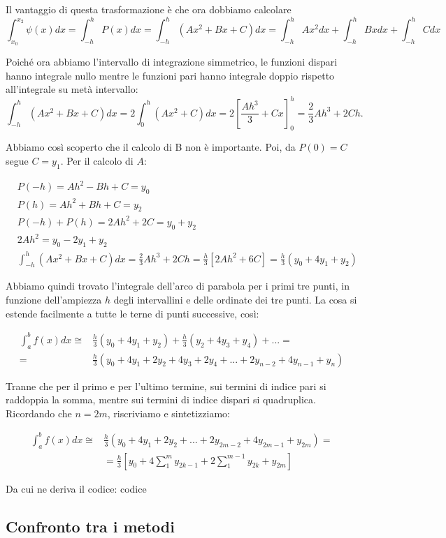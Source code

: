 \documentclass{article}
\begin{document}
Il vantaggio di questa trasformazione è che ora dobbiamo calcolare
\[
\int_{x_0}^{x_2}\psi(x)dx=\int_{-h}^{h}P(x)dx=\int_{-h}^{h}(Ax^2+Bx+C)dx=
\int_{-h}^{h}Ax^2dx+\int_{-h}^{h}Bxdx+\int_{-h}^{h}Cdx\]

Poiché ora abbiamo l’intervallo di integrazione simmetrico, le funzioni dispari hanno integrale nullo mentre le funzioni pari hanno integrale doppio rispetto all’integrale su metà intervallo:
\[
\int_{-h}^{h}(Ax^2+Bx+C)dx= 2 \int_0^{h}(Ax^2+C)dx
=2\left[\frac{Ah^3}{3}+Cx\right]_0^h=\frac{2}{3}Ah^3+2Ch.\]

Abbiamo così scoperto che il calcolo di B non è importante. Poi, da $P(0)=C$ segue $C=y_1$. Per il calcolo di $A$:

\begin{align*}
&P(-h)=Ah^2-Bh+C=y_0\\
&P(h)=Ah^2+Bh+C=y_2\\
&P(-h)+P(h)=2Ah^2+2C=y_0+y_2\\
&2Ah^2=y_0-2y_1+y_2\\
&\int_{-h}^{h}(Ax^2+Bx+C)dx=\frac{2}{3}Ah^3+2Ch=\frac{h}{3}\left[2Ah^2+6C \right]=
\frac{h}{3}(y_0+4y_1+y_2)
\end{align*}

Abbiamo quindi trovato l’integrale dell’arco di parabola per i primi tre punti, in funzione dell’ampiezza $h$ degli intervallini e delle ordinate dei tre punti. La cosa si estende facilmente a tutte le terne di punti successive, così:

\begin{align*}
\int_a^bf(x)dx\cong &\frac{h}{3}(y_0+4y_1+y_2)+\frac{h}{3}(y_2+4y_3+y_4)+ ...=\\
=&\frac{h}{3}(y_0+4y_1+2y_2+4y_3+2y_4+ ... +2y_{n-2}+4y_{n-1}+y_n)
\end{align*}

Tranne che per il primo e per l’ultimo termine, sui termini di indice pari si raddoppia la somma, mentre sui termini di indice dispari si quadruplica. Ricordando che $n=2m$, riscriviamo e sintetizziamo:

\begin{align*}
\int_a^bf(x)dx\cong &\frac{h}{3}(y_0+4y_1+2y_2+ ... +2y_{2m-2}+4y_{2m-1}+y_{2m})=\\
&=\frac{h}{3}\left[y_0+4\sum_1^m y_{2k-1}+2\sum_1^{m-1}y_{2k}+y_{2m} \right]
\end{align*}

Da cui ne deriva il codice: 
codice

\subsection{Confronto tra i metodi}
\end{document}
